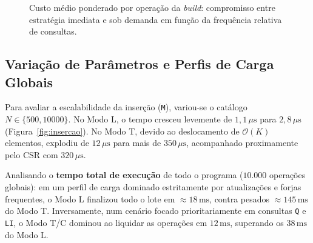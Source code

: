 \documentclass[letterpaper]{article}
\begin{document}
\begin{figure}[t]
\centering
{}
\caption{Custo médio ponderado por operação da \textit{build}: compromisso entre estratégia imediata e sob demanda em função da frequência relativa de consultas.}
\label{fig:build}
\end{figure}

\subsection{Variação de Parâmetros e Perfis de Carga Globais}
Para avaliar a escalabilidade da inserção (\texttt{M}), variou-se o catálogo $N \in \{500, 10000\}$. No Modo L, o tempo cresceu levemente de $1{,}1\,\mu\text{s}$ para $2{,}8\,\mu\text{s}$ (Figura~\ref{fig:insercao}). No Modo T, devido ao deslocamento de $\mathcal{O}(K)$ elementos, explodiu de $12\,\mu\text{s}$ para mais de $350\,\mu\text{s}$, acompanhado proximamente pelo CSR com $320\,\mu\text{s}$.

Analisando o \textbf{tempo total de execução} de todo o programa ($10.000$ operações globais): em um perfil de carga dominado estritamente por atualizações e forjas frequentes, o Modo L finalizou todo o lote em $\approx 18\,\text{ms}$, contra pesados $\approx 145\,\text{ms}$ do Modo T. Inversamente, num cenário focado prioritariamente em consultas \texttt{Q} e \texttt{LI}, o Modo T/C dominou ao liquidar as operações em $12\,\text{ms}$, superando os $38\,\text{ms}$ do Modo L.
\end{document}

